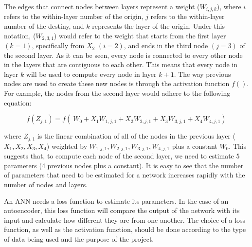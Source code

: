 \documentclass{article}
\begin{document}
The edges that connect nodes between layers represent a weight (\begin{math}W_{i,j,k}\end{math}), where $i$ refers to the within-layer number of the origin, $j$ refers to the within-layer number of the destiny, and $k$ represents the layer of the origin. Under this notation, (\begin{math}W_{2,3,1}\end{math}) would refer to the weight that starts from the first layer $(k = 1)$, specifically from \begin{math}X_2\end{math} $(i = 2)$, and ends in the third node $(j = 3)$ of the second layer. As it can be seen, every node is connected to every other node in the layers that are contiguous to each other. This means that every node in layer $k$ will be used to compute every node in layer $k+1$. The way previous nodes are used to create these new nodes is through the activation function  \begin{math}f()\end{math}. For example, the nodes from the second layer would adhere to the following equation: 

\begin{equation}
    f(Z_{j,1}) = f(\ W_0 + X_1W_{1,j,1} + X_2W_{2,j,1} + X_3W_{3,j,1} + X_4W_{4,j,1})
\end{equation}


where \begin{math}Z_{j,1}\end{math} is the linear combination of all of the nodes in the previous layer (\begin{math}X_1, X_2, X_3, X_4\end{math}) weighted by \begin{math}W_{1,j,1}, W_{2,j,1}, W_{3,j,1}, W_{4,j,1}\end{math} plus a constant \begin{math}W_0\end{math}. This suggests that, to compute each node of the second layer, we need to estimate 5 parameters (4 previous nodes plus a constant). It is easy to see that the number of parameters that need to be estimated for a network increases rapidly with the number of nodes and layers.  

An ANN needs a loss function to estimate its parameters. In the case of an autoencoder, this loss function will compare the output of the network with its input and calculate how different they are from one another. The choice of a loss function, as well as the activation function, should be done according to the type of data being used and the purpose of the project. 
\end{document}
